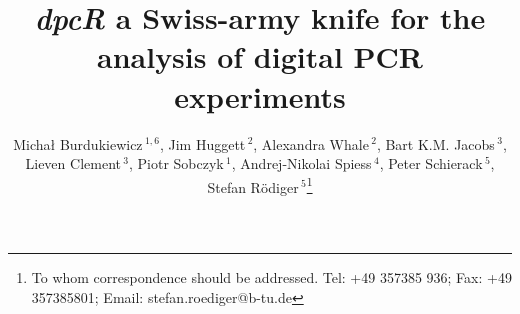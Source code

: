 \documentclass[a4,center,fleqn]{NAR}
\begin{document}
\title{\textit{dpcR} a Swiss-army knife for the analysis of digital PCR experiments}

\author{%
Micha\l{} Burdukiewicz\,$^{1,6}$,
Jim Huggett\,$^{2}$,
Alexandra Whale\,$^{2}$,
Bart K.M. Jacobs\,$^{3}$,
Lieven Clement\,$^{3}$,
Piotr Sobczyk\,$^{1}$,
Andrej-Nikolai Spiess\,$^{4}$,
Peter Schierack\,$^{5}$,
Stefan R\"odiger\,$^{5}$\footnote{To whom correspondence should be addressed.
Tel: +49 357385 936; Fax: +49 357385801; Email: stefan.roediger@b-tu.de}}

\address{%
$^{1}$Department of Genomics, Faculty of Biotechnology, University of Wroc\l{}aw, Wroc\l{}aw, Poland
and
$^{2}$Molecular and Cell Biology Team, LGC, Teddington, United Kingdom
and
$^{3}$Department of Applied Mathematics, Computer Science and Statistics, Ghent University, Belgium
and
$^{4}$University Medical Center Hamburg-Eppendorf, Hamburg, Germany
and
$^{5}$Faculty of Natural Sciences, Brandenburg University of Technology Cottbus--Senftenberg, Gro\ss{}enhainer Str. 57, 01968, Senftenberg, Germany
}


\maketitle
\end{document}
